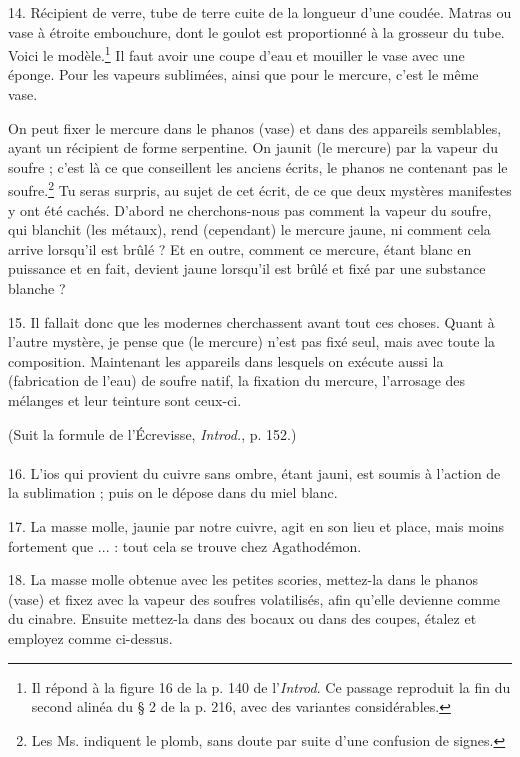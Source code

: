 \documentclass[landscape, a4paper, 11pt, oneside, polutonikogreek, french]{article}
\begin{document}
14. Récipient de verre, tube de terre cuite de la longueur d'une coudée. Matras ou vase à étroite embouchure, dont le goulot est proportionné à la grosseur du tube. Voici le modèle.\footnote{Il répond à la figure 16 de la p. 140 de l'\emph{Introd}. Ce passage reproduit la fin du second alinéa du § 2 de la p. 216, avec des variantes considérables.} Il faut avoir une coupe d'eau et mouiller le vase avec une éponge. Pour les vapeurs sublimées, ainsi que pour le mercure, c'est le même vase.

On peut fixer le mercure dans le phanos (vase) et dans des appareils semblables, ayant un récipient de forme serpentine. On jaunit (le mercure) par la vapeur du soufre ; c'est là ce que conseillent les anciens écrits, le phanos ne contenant pas le soufre.\footnote{Les Ms. indiquent le plomb, sans doute par suite d'une confusion de signes.} Tu seras surpris, au sujet de cet écrit, de ce que deux mystères manifestes y ont été cachés. D'abord ne cherchons-nous pas comment la vapeur du soufre, qui blanchit (les métaux), rend (cependant) le mercure jaune, ni comment cela arrive lorsqu'il est brûlé ? Et en outre, comment ce mercure, étant blanc en puissance et en fait, devient jaune lorsqu'il est brûlé et fixé par une substance blanche ?

15. Il fallait donc que les modernes cherchassent avant tout ces choses. Quant à l'autre mystère, je pense que (le mercure) n'est pas fixé seul, mais avec toute la composition. Maintenant les appareils dans lesquels on exécute aussi la (fabrication de l'eau) de soufre natif, la fixation du mercure, l'arrosage des mélanges et leur teinture sont ceux-ci.
\begin{center}
(Suit la formule de l'Écrevisse, \emph{Introd.}, p. 152.)
\end{center}
\paragraph{}
16. L'ios qui provient du cuivre sans ombre, étant jauni, est soumis à l'action de la sublimation ; puis on le dépose dans du miel blanc.

17. La masse molle, jaunie par notre cuivre, agit en son lieu et place, mais moins fortement que ... : tout cela se trouve chez Agathodémon.

18. La masse molle obtenue avec les petites scories, mettez-la dans le phanos (vase) et fixez avec la vapeur des soufres volatilisés, afin qu'elle devienne comme du cinabre. Ensuite mettez-la dans des bocaux ou dans des coupes, étalez et employez comme ci-dessus.
\end{document}
